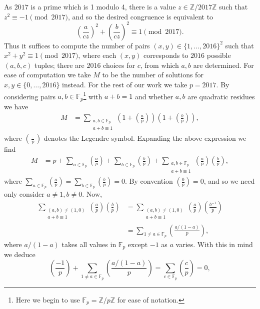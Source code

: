 \documentclass[10pt]{article}
\begin{document}
\begin{enumerate}
\iffalse	
	As $2017$ is a prime which is 1 modulo 4, there is a value $z \in \mathbb{Z}/2017\mathbb{Z}$ such that $z^{2} \equiv -1 \pmod{2017}$, and so the desired congruence is equivalent to 
		\[
			\left( \frac{a}{cz} \right)^{2} +\left( \frac{b}{cz} \right)^{2} \equiv 1 \pmod{2017}.
		\]
		Thus it suffices to compute the number of pairs $(x,y) \in \{1,\ldots, 2016\}^{2}$ such that $x^{2} + y^{2} \equiv 1 \pmod{2017}$, where each $(x,y)$ corresponds to $2016$ possible $(a,b,c)$ tuples; there are 2016 choices for $c$, from which $a,b$ are determined. For ease of computation we take $M$ to be the number of solutions for $x,y \in \{0, \ldots, 2016\}$ instead. For the rest of our work we take $p = 2017$. By considering pairs $a,b \in \mathbb{F}_p$\footnote{Here we begin to use $\mathbb{F}_{p} = \mathbb{Z}/p\mathbb{Z}$ for ease of notation.} with $a+b=1$ and whether $a,b$ are quadratic residues we have
		\begin{align*}
			M &=  \sum_{\substack{a, b \in \mathbb{F}_{p}\\ a+b \equiv 1}}^{} \left( 1 + \left( \frac{a}{p} \right) \right) \left( 1 + \left( \frac{b}{p} \right) \right),
		\end{align*}
		where $(\frac{\cdot}{p})$ denotes the Legendre symbol. Expanding the above expression we find 
		\begin{align*}
			M &= p + \sum_{a \in \mathbb{F}_{p}}^{} \left( \frac{a}{p} \right) + \sum_{b \in \mathbb{F}_{p}}^{} \left( \frac{b}{p} \right) + \sum_{\substack{a,b \in \mathbb{F}_{p}\\ a + b \equiv 1}}^{} \left( \frac{a}{p} \right)\left( \frac{b}{p} \right),
		\end{align*}
		where $\sum_{a \in \mathbb{F}_{p}}^{} (\frac{a}{p}) = \sum_{b \in \mathbb{F}_{p}}^{} (\frac{b}{p}) = 0$. By convention $(\frac{0}{p}) = 0$, and so we need only consider $a \neq 1, b \neq 0$. Now,
		\begin{align*}
			\sum_{\substack{(a,b) \neq (1,0)\\ a + b \equiv 1}}^{} \left( \frac{a}{p} \right) \left( \frac{b}{p} \right) &= \sum_{\substack{(a,b) \neq (1,0)\\ a + b \equiv 1}}^{} \left( \frac{a}{p} \right) \left( \frac{b^{-1}}{p} \right)\\
			&= \sum_{1 \neq a \in \mathbb{F}_{p}}^{} \left( \frac{a/(1-a)}{p} \right),
		\end{align*}
		where $a/(1-a)$ takes all values in $\mathbb{F}_{p}$ except $-1$ as $a$ varies. With this in mind we deduce
		\[
			\left( \frac{-1}{p} \right) + \sum_{1 \neq a \in \mathbb{F}_{p}}^{} \left( \frac{a/(1-a)}{p} \right) = \sum_{c \in \mathbb{F}_{p}}^{} \left( \frac{c}{p} \right) = 0,
\]
\end{enumerate}
\end{document}
